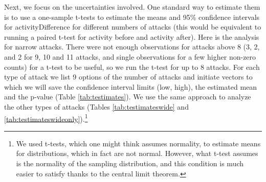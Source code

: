 \documentclass[
  10pt,
  dvipsnames]{scrartcl}
\begin{document}
Next, we focus on the uncertainties involved. One standard way to
estimate them is to use a one-sample t-tests to estimate the means and
95\% confidence intervals for \textsf{activityDifference} for different
numbers of attacks (this would be equivalent to running a paired t-test
for activity before and activity after). Here is the analysis for narrow
attacks. There were not enough observations for attacks above 8 (3, 2,
and 2 for 9, 10 and 11 attacks, and single observations for a few higher
non-zero counts) for a t-test to be useful, so we run the t-test for up
to 8 attacks. For each type of attack we list 9 options of the number of
attacks and initiate vectors to which we will save the confidence
interval limits (\textsf{low}, \textsf{high}), the estimated mean and
the \textsf{p}-value (Table \ref{tab:testimates}). We use the same
approach to analyze the other types of attacks (Tables
\ref{tab:testimateswide} and
\ref{tab:testimateswideonly}).\footnote{We used t-tests, which one might think assumes normality, to estimate means  for distributions, which in fact  are not normal. However, what t-test assumes is the normality of the sampling distribution, and this condition is much easier to satisfy thanks to the central limit theorem.}

\footnotesize

\normalsize

\footnotesize

\normalsize
\end{document}
